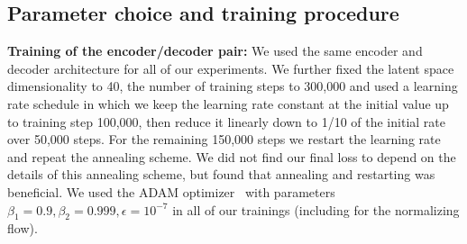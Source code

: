 \documentclass[10pt]{article} \usepackage[accepted]{tmlr}
\begin{document}
\subsection{Parameter choice and training procedure}
\label{sec:param_choice}
\hfill \break
\textbf{Training of the encoder/decoder pair:} We used the same encoder and decoder architecture for all of our experiments. We further fixed the latent space dimensionality to 40, the number of training steps to 300,000 and used a learning rate schedule in which we keep the learning rate constant at the initial value up to training step 100,000, then reduce it linearly down to 1/10 of the initial rate over 50,000 steps. For the remaining 150,000 steps we restart the learning rate and repeat the annealing scheme. We did not find our final loss to depend on the details of this annealing scheme, but found that annealing and restarting was beneficial. We used the ADAM optimizer~\citep{KingmaB14} with parameters $\beta_1=0.9, \beta_2=0.999, \epsilon=10^{-7}$ in all of our trainings (including for the normalizing flow).
\end{document}
